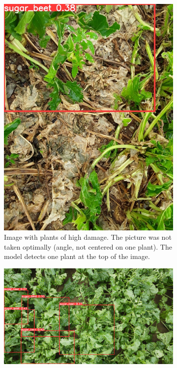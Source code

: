 \begin{figure}[htb!]
\begin{subfigure}{.4\textwidth}
		\includegraphics[scale=0.2]{figures/result_3.jpg}
		\caption{Image with plants of high damage. The picture was not taken optimally (angle, not centered on one plant). The model detects one plant at the top of the image.}
		\label{fig:result_3}
	\end{subfigure}
	\begin{subfigure}{.6\textwidth}
		\centering
		\includegraphics[scale=0.115]{figures/result_4.png}

\end{subfigure}
\end{figure}
